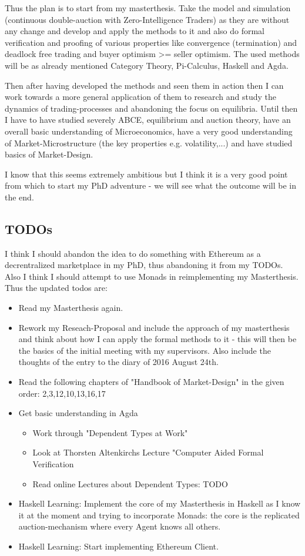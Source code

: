 Thus the plan is to start from my masterthesis. Take the model and simulation (continuous double-auction with Zero-Intelligence Traders) as they are without any change and develop and apply the methods to it and also do formal verification and proofing of various properties like convergence (termination) and deadlock free trading and buyer optimism >= seller optimism. The used methods will be as already mentioned Category Theory, Pi-Calculus, Haskell and Agda.

\bigskip

Then after having developed the methods and seen them in action then I can work towards a more general application of them to research and study the dynamics of trading-processes and abandoning the focus on equilibria. Until then I have to have studied severely ABCE, equilibrium and auction theory, have an overall basic understanding of Microeconomics, have a very good understanding of Market-Microstructure (the key properties e.g. volatility,...) and have studied basics of Market-Design.

\bigskip

I know that this seems extremely ambitious but I think it is a very good point from which to start my PhD adventure - we will see what the outcome will be in the end.

\subsection*{TODOs}
I think I should abandon the idea to do something with Ethereum as a decrentralized marketplace in my PhD, thus abandoning it from my TODOs. Also I think I should attempt to use Monads in reimplementing my Masterthesis. \\ Thus the updated todos are:

\begin{itemize}
\item Read my Masterthesis again.
\item Rework my Reseach-Proposal and include the approach of my masterthesis and think about how I can apply the formal methods to it - this will then be the basics of the initial meeting with my supervisors. Also include the thoughts of the entry to the diary of 2016 August 24th.
\item Read the following chapters of "Handbook of Market-Design" in the given order: 2,3,12,10,13,16,17
\item Get basic understanding in Agda 
	\begin{itemize}
	\item Work through "Dependent Types at Work"
	\item Look at Thorsten Altenkirchs Lecture "Computer Aided Formal Verification
	\item Read online Lectures about Dependent Types: TODO
	\end{itemize}
\item Haskell Learning: Implement the core of my Masterthesis in Haskell as I know it at the moment and trying to incorporate Monads: the core is the replicated auction-mechanism where every Agent knows all others.
\item Haskell Learning: Start implementing Ethereum Client.
\end{itemize}

